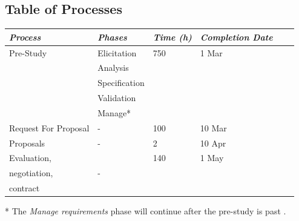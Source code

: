 \documentclass[a4paper]{article}
\begin{document}
\subsection{Table of Processes}
\begin{table}[!ht]
	\centering
	\begin{tabular}{|p{2cm}| p{3cm} |l| p{2cm} | p{1.1cm} | p{1.7cm}|}
	\hline
		\textit{Process} & \textit{Phases} & \textit{Time (h)} & \textit{Completion Date} \\
	\hline
		Pre-Study & Elicitation &  750 & 1 Mar\\
				  & Analysis & & \\
				  & Specification & & \\
				  & Validation & & \\
				  & Manage* & &\\ \hline
		Request For Proposal & - & 100 &10 Mar\\ \hline
		Proposals & - & 2&10 Apr\\ \hline
		Evaluation, &  &  140&1 May\\
		negotiation, & - & & \\
		contract & & & \\
	\hline
	\end{tabular}
\end{table}
* The \emph{Manage requirements} phase will continue after the pre-study is past \cite{gott7}.
\end{document}
